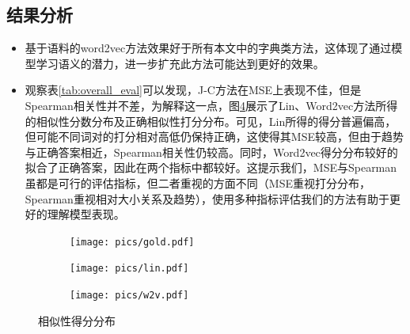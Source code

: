 \documentclass{article}
\begin{document}
\subsection{结果分析}
\begin{itemize}
  \item 基于语料的word2vec方法效果好于所有本文中的字典类方法，这体现了通过模型学习语义的潜力，进一步扩充此方法可能达到更好的效果。
  \item 观察表\ref{tab:overall_eval}可以发现，J-C方法在MSE上表现不佳，但是Spearman相关性并不差，为解释这一点，图\ref{fig:distrib}展示了Lin、Word2vec方法所得的相似性分数分布及正确相似性打分分布。可见，Lin所得的得分普遍偏高，但可能不同词对的打分相对高低仍保持正确，这使得其MSE较高，但由于趋势与正确答案相近，Spearman相关性仍较高。同时，Word2vec得分分布较好的拟合了正确答案，因此在两个指标中都较好。这提示我们，MSE与Spearman虽都是可行的评估指标，但二者重视的方面不同（MSE重视打分分布，Spearman重视相对大小关系及趋势），使用多种指标评估我们的方法有助于更好的理解模型表现。
\end{itemize}


\begin{figure}[h]
  \begin{subfigure}{.42\textwidth}
    \texttt{[image: pics/gold.pdf]}
    \caption{}
    \label{fig:gold}
  \end{subfigure}
  \hfill
  \begin{subfigure}{.42\textwidth}
    \texttt{[image: pics/lin.pdf]}
    \caption{}
    \label{fig:lin}
  \end{subfigure}
  \begin{subfigure}{.42\textwidth}
    \centering
    \texttt{[image: pics/w2v.pdf]}
    \caption{}
    \label{fig:w2v}
  \end{subfigure}%
  \caption{相似性得分分布}
  \label{fig:distrib}
  \end{figure}


\end{document}
